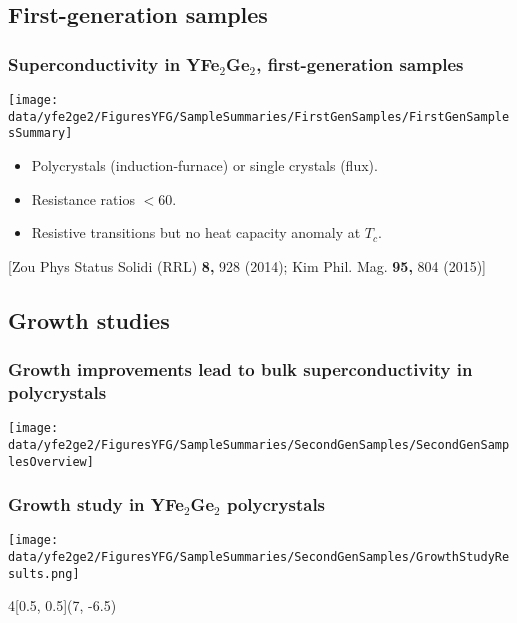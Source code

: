 \subsection{First-generation samples}
\begin{frame}[label=YFGFirstGen]
\frametitle{Superconductivity in YFe$_2$Ge$_2$, first-generation samples}
\centerline{\texttt{[image: \\data/yfe2ge2/FiguresYFG/SampleSummaries/FirstGenSamples/FirstGenSamplesSummary]}}
\begin{itemize}
\item
Polycrystals (induction-furnace) or single crystals (flux).
\item
Resistance ratios $< 60$. 
\item
Resistive transitions but no heat capacity anomaly at $T_c$.
\end{itemize}

\vspace*{\fill}
\centerline{\makebox[\linewidth]{\rule{0.85\textwidth}{0.4pt}}}
\centerline{\scriptsize [Zou Phys Status Solidi (RRL) {\bf 8,} 928
  (2014); Kim Phil. Mag. {\bf 95,} 804 (2015)]}
\end{frame}


\subsection{Growth studies}
\begin{frame}[label=YFGSecondGen]
\frametitle{Growth improvements lead to bulk superconductivity in polycrystals}
\centerline{\texttt{[image: \\data/yfe2ge2/FiguresYFG/SampleSummaries/SecondGenSamples/SecondGenSamplesOverview]}}


\end{frame}

\begin{frame}[label=YFGSecondGen]
\frametitle{Growth study in YFe$_2$Ge$_2$ polycrystals}
\centerline{\texttt{[image: \\data/yfe2ge2/FiguresYFG/SampleSummaries/SecondGenSamples/GrowthStudyResults.png]}}
\begin{textblock}{4}[0.5, 0.5](7, -6.5)
\end{textblock}
\end{frame}




